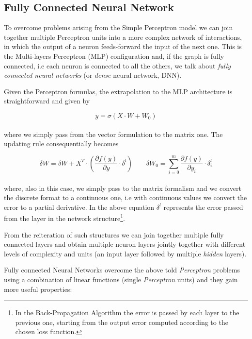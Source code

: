 \documentclass{standalone}
\begin{document}
\subsection[Fully Connected Neural Network]{Fully Connected Neural Network}\label{NN:connected}

To overcome problems arising from the Simple Perceptron model we can join together multiple Perceptron units into a more complex network of interactions, in which the output of a neuron feeds-forward the input of the next one.
This is the Multi-layers Perceptron (MLP) configuration and, if the graph is fully connected, i.e each neuron is connected to all the others, we talk about \emph{fully connected neural networks} (or \emph{dense} neural network, DNN).

Given the Perceptron formulas, the extrapolation to the MLP architecture is straightforward and given by

\begin{equation}
y = \sigma\left(X \cdot W + W_0 \right)
\end{equation}
\\
where we simply pass from the vector formulation to the matrix one.
The updating rule consequentially becomes

\begin{equation}
\delta W = \delta W + X^T \cdot \left( \frac{\partial f(y)}{\partial y} \cdot \delta^l \right) \quad\quad \delta W_0 = \sum_{i=0}^{m}\frac{\partial f(y)}{\partial y_i} \cdot \delta_i^l
\end{equation}
\\
where, also in this case, we simply pass to the matrix formalism and we convert the discrete format to a continuous one, i.e with continuous values we convert the error to a partial derivative.
In the above equation $\delta^l$ represents the error passed from the  layer in the network structure\footnote{
  In the Back-Propagation Algorithm the error is passed by each layer to the previous one, starting from the output error computed according to the chosen loss function.
}.

From the reiteration of such structures we can join together multiple fully connected layers and obtain multiple neuron layers jointly together with different levels of complexity and units (an input layer followed by multiple \emph{hidden} layers).

Fully connected Neural Networks overcome the above told \emph{Perceptron} problems using a combination of linear functions (single \emph{Perceptron} units) and they gain more useful properties:
\end{document}
